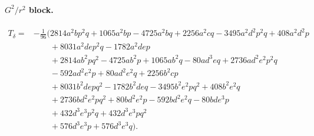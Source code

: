 \documentclass[11pt]{article}
\begin{document}
\paragraph{$G^2/r^2$ block.}
\begin{equation}
\begin{aligned}
T_\delta={}&-\frac{1}{96}\Big(
2814 a^2 b p^2 q + 1065 a^2 b p - 4725 a^2 b q + 2256 a^2 c q
- 3495 a^2 d^2 p^2 q + 408 a^2 d^2 p
\\
&\hspace{2em}+ 8031 a^2 d e p^2 q - 1782 a^2 d e p
\\
&\hspace{2em}+ 2814 a b^2 p q^2 - 4725 a b^2 p + 1065 a b^2 q
- 80 a d^3 e q + 2736 a d^2 e^2 p^2 q
\\
&\hspace{2em}- 592 a d^2 e^2 p + 80 a d^2 e^2 q + 2256 b^2 c p
\\
&\hspace{2em}+ 8031 b^2 d e p q^2 - 1782 b^2 d e q
- 3495 b^2 e^2 p q^2 + 408 b^2 e^2 q
\\
&\hspace{2em}+ 2736 b d^2 e^2 p q^2 + 80 b d^2 e^2 p
- 592 b d^2 e^2 q - 80 b d e^3 p
\\
&\hspace{2em}+ 432 d^3 e^3 p^2 q + 432 d^3 e^3 p q^2
\\
&\hspace{2em}+ 576 d^3 e^3 p + 576 d^3 e^3 q
\Big).
\end{aligned}
\label{eq:app-structured-aligned-seed-Tdelta}
\end{equation}
\end{document}
